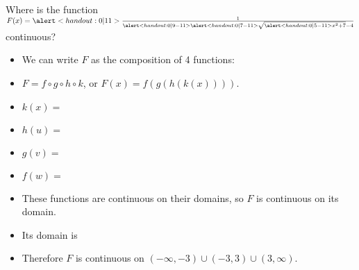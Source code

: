 \begin{frame}
\begin{example}%
Where is the function $F(x) = \alert<handout:0 |11>{\frac{1}{\alert<handout:0 |9-11>{\alert<handout:0 |7-11>{\sqrt{\alert<handout:0 |5-11>{x^2+7}}} - 4}}}$ continuous?
\begin{itemize}
\item<2->  We can write $F$ as the composition of 4 functions:
\item<2->  $F = f\circ g\circ h\circ k$, or $F(x) = f(g(h(k(x))))$.
\item<3-| alert@4-5>  $k(x) = $ 
\item<3-| alert@6-7>  $h(u) = $ 
\item<3-| alert@8-9>  $g(v) = $ 
\item<3-| alert@10-11>  $f(w) = $ 
\item<12->  These functions are continuous on their domains, so $F$ is continuous on its domain.
\item<13->  Its domain is 
\item<15->  Therefore $F$ is continuous on $(-\infty , -3 ) \cup (-3, 3) \cup (3, \infty )$.
\end{itemize}
\end{example}
\end{frame}

